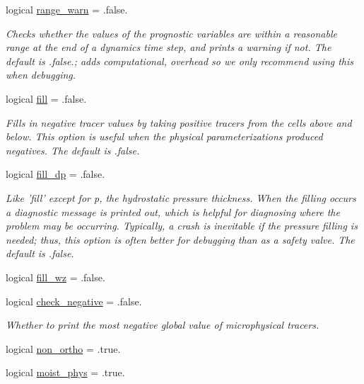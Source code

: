 \begin{DoxyCompactItemize}
logical \hyperlink{structfv__arrays__mod_1_1fv__flags__type_a1aad6b4b7d136e69a2ceadbf8ce7a72e}{range\-\_\-warn} = .false.
\begin{DoxyCompactList}\small\item\em Checks whether the values of the prognostic variables are within a reasonable range at the end of a dynamics time step, and prints a warning if not. The default is .false.; adds computational, overhead so we only recommend using this when debugging. \end{DoxyCompactList}\item 
logical \hyperlink{structfv__arrays__mod_1_1fv__flags__type_abc28981ee78d98024ddf466784f575b6}{fill} = .false.
\begin{DoxyCompactList}\small\item\em Fills in negative tracer values by taking positive tracers from the cells above and below. This option is useful when the physical parameterizations produced negatives. The default is .false. \end{DoxyCompactList}\item 
logical \hyperlink{structfv__arrays__mod_1_1fv__flags__type_a900830b0b645ed0a0c9d62907158432d}{fill\-\_\-dp} = .false.
\begin{DoxyCompactList}\small\item\em Like 'fill' except for p, the hydrostatic pressure thickness. When the filling occurs a diagnostic message is printed out, which is helpful for diagnosing where the problem may be occurring. Typically, a crash is inevitable if the pressure filling is needed; thus, this option is often better for debugging than as a safety valve. The default is .false. \end{DoxyCompactList}\item 
logical \hyperlink{structfv__arrays__mod_1_1fv__flags__type_ad68d757243a380398edfa7ed880d039f}{fill\-\_\-wz} = .false.
\item 
logical \hyperlink{structfv__arrays__mod_1_1fv__flags__type_a6fa5be2c75d0c6fd4c3d79f36bc3d87a}{check\-\_\-negative} = .false.
\begin{DoxyCompactList}\small\item\em Whether to print the most negative global value of microphysical tracers. \end{DoxyCompactList}\item 
logical \hyperlink{structfv__arrays__mod_1_1fv__flags__type_a2d1ec9358d2350da3427de40c7e9dc0b}{non\-\_\-ortho} = .true.
\item 
logical \hyperlink{structfv__arrays__mod_1_1fv__flags__type_a0c6144d2c4d8315584cd4ddb8b2a4ba7}{moist\-\_\-phys} = .true.

\end{DoxyCompactItemize}
